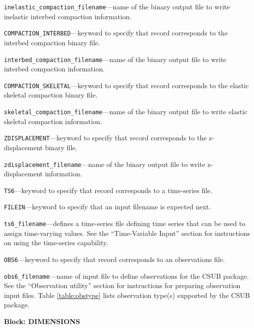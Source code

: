 \begin{description}
\item \texttt{inelastic\_compaction\_filename}---name of the binary output file to write inelastic interbed compaction information.

\item \texttt{COMPACTION\_INTERBED}---keyword to specify that record corresponds to the interbed compaction binary file.

\item \texttt{interbed\_compaction\_filename}---name of the binary output file to write interbed compaction information.

\item \texttt{COMPACTION\_SKELETAL}---keyword to specify that record corresponds to the elastic skeletal compaction binary file.

\item \texttt{skeletal\_compaction\_filename}---name of the binary output file to write elastic skeletal compaction information.

\item \texttt{ZDISPLACEMENT}---keyword to specify that record corresponds to the z-displacement binary file.

\item \texttt{zdisplacement\_filename}---name of the binary output file to write z-displacement information.

\item \texttt{TS6}---keyword to specify that record corresponds to a time-series file.

\item \texttt{FILEIN}---keyword to specify that an input filename is expected next.

\item \texttt{ts6\_filename}---defines a time-series file defining time series that can be used to assign time-varying values. See the ``Time-Variable Input'' section for instructions on using the time-series capability.

\item \texttt{OBS6}---keyword to specify that record corresponds to an observations file.

\item \texttt{obs6\_filename}---name of input file to define observations for the CSUB package. See the ``Observation utility'' section for instructions for preparing observation input files. Table \ref{table:obstype} lists observation type(s) supported by the CSUB package.

\end{description}
\item \textbf{Block: DIMENSIONS}

